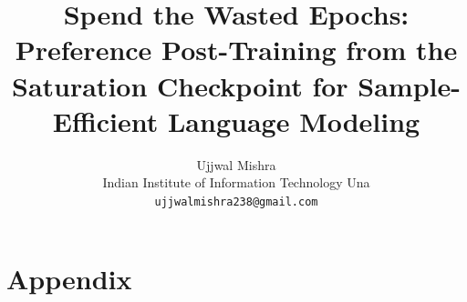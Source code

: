 \documentclass[11pt]{article}
\title{Spend the Wasted Epochs: Preference Post-Training from the\\Saturation Checkpoint for Sample-Efficient Language Modeling}
\author{Ujjwal Mishra \\
  Indian Institute of Information Technology Una \\
  \texttt{ujjwalmishra238@gmail.com} \\}
\begin{document}
\maketitle
















\clearpage
\raggedbottom   %
\appendix
\section*{Appendix}

\end{document}
